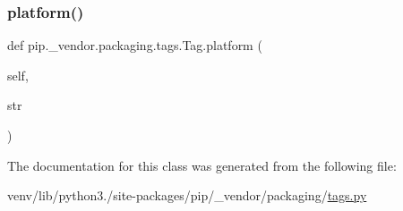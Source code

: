 \mbox{\label{classpip_1_1__vendor_1_1packaging_1_1tags_1_1Tag_a01076d9d1318a7bba5fb9bf344b3d7f9}} 
\subsubsection{\texorpdfstring{platform()}{platform()}}
{\footnotesize\ttfamily def pip.\+\_\+vendor.\+packaging.\+tags.\+Tag.\+platform (\begin{DoxyParamCaption}\item[{}]{self,  }\item[{}]{str }\end{DoxyParamCaption})}



The documentation for this class was generated from the following file\+:\begin{DoxyCompactItemize}
\item 
venv/lib/python3./site-\/packages/pip/\+\_\+vendor/packaging/\hyperlink{pip_2__vendor_2packaging_2tags_8py}{tags.\+py}\end{DoxyCompactItemize}
